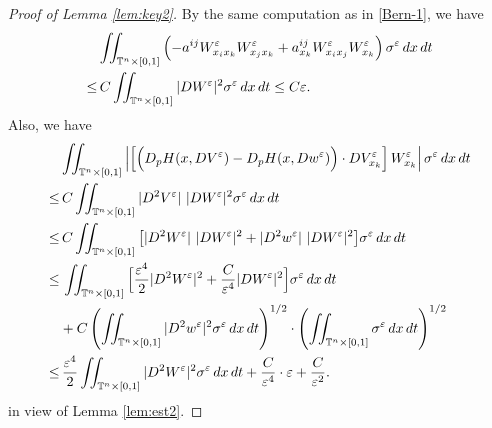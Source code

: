 \documentclass[12pt,reqno]{amsart}
\theoremstyle{plain}
\theoremstyle{remark}
\numberwithin{equation}{section}
\begin{document}
\begin{proof}[Proof of Lemma {\rm\ref{lem:key2}}]
By the same computation as in \eqref{Bern-1}, we have 
\begin{align}
&\iint_{{\mathbb{T}}^n\times[0,1]}
\left(-a^{ij}W^{\varepsilon}_{x_ix_k}W^{\varepsilon}_{x_jx_k}
+a^{ij}_{x_k}W^{\varepsilon}_{x_ix_j}W^{\varepsilon}_{x_k}\right){\sigma}^{\varepsilon}\,dx\,dt \notag\\
\le&\, 
C\iint_{{\mathbb{T}}^n\times[0,1]}
|DW^{\varepsilon}|^2{\sigma}^{\varepsilon}\,dx\,dt
\le C{\varepsilon}. \label{comb-1}
\end{align}
Also, we have 
\begin{align}
&
\iint_{{\mathbb{T}}^n\times[0,1]}
\left|\left[ \Big( D_p H(x,DV^{\varepsilon})-D_p H(x,Dw^{\varepsilon}) \Big) \cdot DV^{\varepsilon}_{x_k} \right]
W^{\varepsilon}_{x_k}\right|{\sigma}^{\varepsilon}\,dx\,dt\notag\\
\le&\, 
C \iint_{{\mathbb{T}}^n\times[0,1]}
|D^2 V^{\varepsilon}|\  |DW^{\varepsilon}|^2{\sigma}^{\varepsilon}\,dx\,dt\notag\\
\le&\, 
C \iint_{{\mathbb{T}}^n\times[0,1]}
\big[|D^2 W^{\varepsilon}|\  |DW^{\varepsilon}|^2 + |D^2 w^{\varepsilon}|\  |DW^{\varepsilon}|^2\big]
{\sigma}^{\varepsilon}\,dx\,dt\notag
\\
\le&\, 
\iint_{{\mathbb{T}}^n\times[0,1]}
\Big[\dfrac{{\varepsilon}^4}{2}  |D^2W^{\varepsilon}|^2
+\dfrac{C}{{\varepsilon}^4} |DW^{\varepsilon}|^2\Big]{\sigma}^{\varepsilon}\,dx\,dt \notag\\
&+ C
\left(\iint_{{\mathbb{T}}^n\times[0,1]}
|D^2 w^{\varepsilon}|^2{\sigma}^{\varepsilon}\,dx\,dt\right)^{1/2}\cdot
\left(\iint_{{\mathbb{T}}^n\times[0,1]}{\sigma}^{\varepsilon}\,dx\,dt\right)^{1/2}\notag\\
\le&\, 
\dfrac{{\varepsilon}^4}{2}\iint_{{\mathbb{T}}^n\times[0,1]}
 |D^2W^{\varepsilon}|^2{\sigma}^{\varepsilon}\,dx\,dt
 +\frac{C}{{\varepsilon}^4}\cdot{\varepsilon}+\frac{C}{{\varepsilon}^2}. \label{comb-2}
\end{align}
in view of Lemma \ref{lem:est2}. 


\end{proof}
\end{document}
